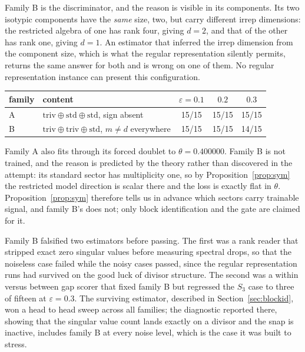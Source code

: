 \documentclass[11pt]{article}
\begin{document}
Family B is the discriminator, and the reason is visible in its components. Its
two isotypic components have the \emph{same} size, two, but carry different irrep
dimensions: the restricted algebra of one has rank four, giving $d=2$, and that
of the other has rank one, giving $d=1$. An estimator that inferred the irrep
dimension from the component size, which is what the regular representation
silently permits, returns the same answer for both and is wrong on one of them.
No regular representation instance can present this configuration.

\begin{center}
\begin{tabular}{llccc}
\toprule
family & content & $\varepsilon{=}0.1$ & $0.2$ & $0.3$\\
\midrule
A & $\mathrm{triv}\oplus\mathrm{std}\oplus\mathrm{std}$, sign absent &
15/15 & 15/15 & 15/15\\
B & $\mathrm{triv}\oplus\mathrm{triv}\oplus\mathrm{std}$,
$m\ne d$ everywhere & 15/15 & 15/15 & 14/15\\
\bottomrule
\end{tabular}
\end{center}

Family A also fits through its forced doublet to $\theta=0.400000$. Family B is
not trained, and the reason is predicted by the theory rather than discovered in
the attempt: its standard sector has multiplicity one, so by
Proposition~\ref{prop:sym} the restricted model direction is scalar there and the
loss is exactly flat in $\theta$. Proposition~\ref{prop:sym} therefore tells us
in advance which sectors carry trainable signal, and family B's does not; only
block identification and the gate are claimed for it.

Family B falsified two estimators before passing. The first was a rank reader
that stripped exact zero singular values before measuring spectral drops, so that
the noiseless case failed while the noisy cases passed, since the regular
representation runs had survived on the good luck of divisor structure. The
second was a within versus between gap scorer that fixed family B but regressed
the $S_3$ case to three of fifteen at $\varepsilon=0.3$. The surviving estimator,
described in Section~\ref{sec:blockid}, won a head to head sweep across all
families; the diagnostic reported there, showing that the singular value count
lands exactly on a divisor and the snap is inactive, includes family B at every
noise level, which is the case it was built to stress.
\end{document}
